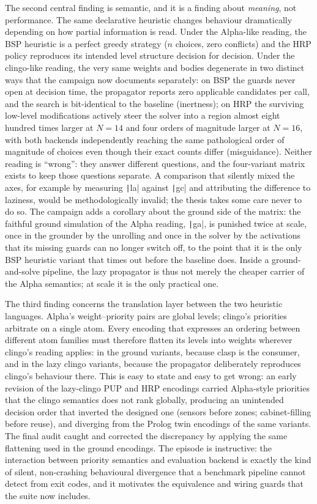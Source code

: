 The second central finding is semantic, and it is a finding about \emph{meaning}, not performance. The same declarative heuristic changes behaviour dramatically depending on how partial information is read. Under the Alpha-like reading, the BSP heuristic is a perfect greedy strategy ($n$ choices, zero conflicts) and the HRP policy reproduces its intended level structure decision for decision. Under the clingo-like reading, the very same weights and bodies degenerate in two distinct ways that the campaign now documents separately: on BSP the guards never open at decision time, the propagator reports zero applicable candidates per call, and the search is bit-identical to the baseline (inertness); on HRP the surviving low-level modifications actively steer the solver into a region almost eight hundred times larger at $N=14$ and four orders of magnitude larger at $N=16$, with both backends independently reaching the same pathological order of magnitude of choices even though their exact counts differ (misguidance). Neither reading is \enquote{wrong}: they answer different questions, and the four-variant matrix exists to keep those questions separate. A comparison that silently mixed the axes, for example by measuring \texttt|la| against \texttt|gc| and attributing the difference to laziness, would be methodologically invalid; the thesis takes some care never to do so. The campaign adds a corollary about the ground side of the matrix: the faithful ground simulation of the Alpha reading, \texttt|ga|, is punished twice at scale, once in the grounder by the unrolling and once in the solver by the activations that its missing guards can no longer switch off, to the point that it is the only BSP heuristic variant that times out before the baseline does. Inside a ground-and-solve pipeline, the lazy propagator is thus not merely the cheaper carrier of the Alpha semantics; at scale it is the only practical one.

The third finding concerns the translation layer between the two heuristic languages. Alpha's weight--priority pairs are global levels; clingo's priorities arbitrate on a single atom. Every encoding that expresses an ordering between different atom families must therefore flatten its levels into weights wherever clingo's reading applies: in the ground variants, because clasp is the consumer, and in the lazy clingo variants, because the propagator deliberately reproduces clingo's behaviour there. This is easy to state and easy to get wrong: an early revision of the lazy-clingo PUP and HRP encodings carried Alpha-style priorities that the clingo semantics does not rank globally, producing an unintended decision order that inverted the designed one (sensors before zones; cabinet-filling before reuse), and diverging from the Prolog twin encodings of the same variants. The final audit caught and corrected the discrepancy by applying the same flattening used in the ground encodings. The episode is instructive: the interaction between priority semantics and evaluation backend is exactly the kind of silent, non-crashing behavioural divergence that a benchmark pipeline cannot detect from exit codes, and it motivates the equivalence and wiring guards that the suite now includes.

